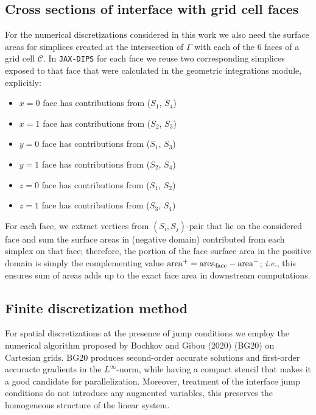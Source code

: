 \documentclass{elsarticle}
\begin{document}
\subsection{Cross sections of interface with grid cell faces}
For the numerical discretizations considered in this work we also need the surface areas for simplices created at the intersection of $\Gamma$ with each of the 6 faces of a grid cell $\mathcal{C}$. In \texttt{JAX-DIPS} for each face we reuse two corresponding simplices exposed to that face that were calculated in the geometric integrations module, explicitly: 
\begin{itemize}
	\item $x=0$ face has contributions from ($S_1$, $S_4$)
	\item $x=1$ face has contributions from ($S_2$, $S_3$)
	\item $y=0$ face has contributions from ($S_1$, $S_3$)
	\item $y=1$ face has contributions from ($S_2$, $S_4$)
	\item $z=0$ face has contributions from ($S_1$, $S_2$)
	\item $z=1$ face has contributions from ($S_3$, $S_4$)
\end{itemize}
For each face, we extract vertices from $(S_i,S_j)$-pair that lie on the considered face and sum the surface areas in (negative domain) contributed from each simplex on that face; therefore, the portion of the face surface area in the positive domain is simply the complementing value $\rm area^+=area_{face}-area^-$; \textit{i.e.}, this ensures sum of areas adds up to the exact face area in downstream computations.







\subsection{Finite discretization method}

For spatial discretizations at the presence of jump conditions we employ the numerical algorithm proposed by Bochkov and Gibou (2020) \cite{bochkov2020solving} (BG20) on Cartesian grids. BG20 produces second-order accurate solutions and first-order accuracte gradients in the $L^\infty$-norm, while having a compact stencil that makes it a good candidate for parallelization. Moreover, treatment of the interface jump conditions do not introduce any augmented variables, this preserves the homogeneous structure of the linear system.
\end{document}

